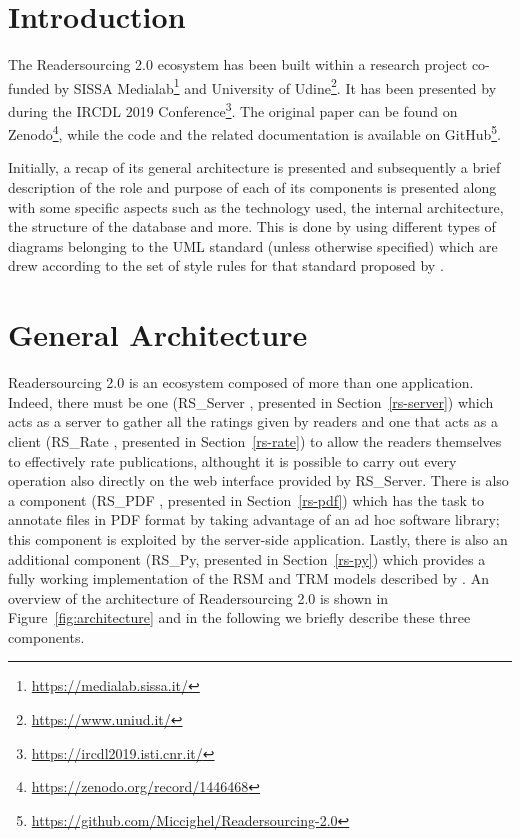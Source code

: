 \documentclass[a4paper, english]{article}
\begin{document}
\maketitle

\tableofcontents

\newpage

\listoffigures

\newpage

\listoftables

\newpage


\section{Introduction}


The Readersourcing 2.0 ecosystem has been built within a research project co-funded by SISSA Medialab\footnote{\url{https://medialab.sissa.it/}} and University of Udine\footnote{\url{https://www.uniud.it/}}. It has been presented by \citet{Soprano2019} during the IRCDL 2019 Conference\footnote{\url{https://ircdl2019.isti.cnr.it/}}. The original paper can be found on Zenodo\footnote{\url{https://zenodo.org/record/1446468}}, while the code and the related documentation is available on GitHub\footnote{\url{https://github.com/Miccighel/Readersourcing-2.0}}. 

Initially, a recap of its general architecture is presented and subsequently a brief description of the role and purpose of each of its components is presented along with some specific aspects such as the technology used, the internal architecture, the structure of the database and more. This is done by using different types of diagrams belonging to the UML standard (unless otherwise specified) which are drew according to the set of style rules for that standard proposed by \citet{Fowler03}.

\section{General Architecture}

Readersourcing 2.0 is an ecosystem composed of more than one application. Indeed, there must be one (RS\_Server \cite{RS-Server}, presented in Section~\ref{rs-server}) which acts as a server to gather all the ratings given by readers and one that acts as a client (RS\_Rate \cite{RS-Rate}, presented in Section~\ref{rs-rate}) to allow the readers themselves to effectively rate publications, althought it is possible to carry out every operation also directly on the web interface provided by RS\_Server. There is also a component (RS\_PDF \cite{RS-PDF}, presented in Section~\ref{rs-pdf}) which has the task to annotate files in PDF format by taking advantage of an ad hoc software library; this component is exploited by the server-side application. Lastly, there is also an additional component (RS\_Py, presented in Section~\ref{rs-py}) which provides a fully working implementation of the RSM and TRM models described by \citet{Soprano2019}. An overview of the architecture of Readersourcing 2.0 is shown in Figure~\ref{fig:architecture} and in the following we briefly describe these three components. 
\end{document}
